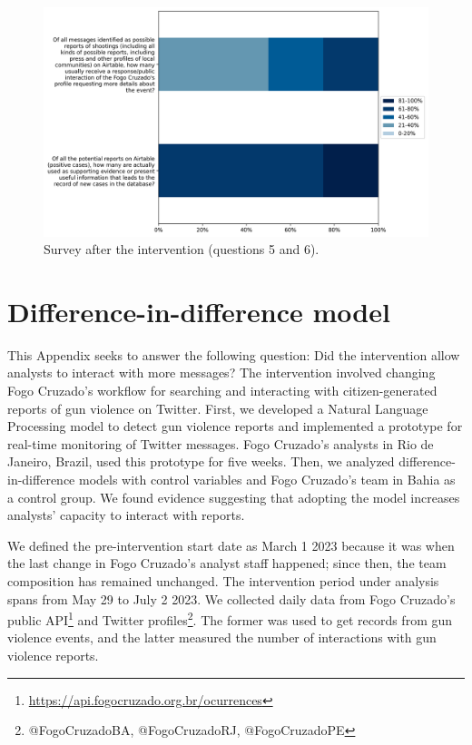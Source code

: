 \documentclass[11pt,letterpaper]{article}
\begin{document}
\begin{figure}[H]
    \centering
    \includegraphics[width=0.8\linewidth]{figs/appendix/post-survey/pos_q5to6.png}
    \caption{Survey after the intervention (questions 5 and 6).}
    \label{fig:postsurvey5to6}
\end{figure}

\section{Difference-in-difference model}

\label{app:diffindiff}
This Appendix seeks to answer the following question: Did the intervention allow analysts to interact with more messages? The intervention involved changing Fogo Cruzado's workflow for searching and interacting with citizen-generated reports of gun violence on Twitter. First, we developed a Natural Language Processing model to detect gun violence reports and implemented a prototype for real-time monitoring of Twitter messages. Fogo Cruzado's analysts in Rio de Janeiro, Brazil, used this prototype for five weeks. Then, we analyzed difference-in-difference models with control variables and Fogo Cruzado's team in Bahia as a control group. We found evidence suggesting that adopting the model increases analysts' capacity to interact with reports.

We defined the pre-intervention start date as March 1 2023 because it was when the last change in Fogo Cruzado's analyst staff happened; since then, the team composition has remained unchanged. The intervention period under analysis spans from May 29 to July 2 2023. We collected daily data from Fogo Cruzado's public API\footnote{\href{https://api.fogocruzado.org.br/ocurrences}{https://api.fogocruzado.org.br/ocurrences}} and Twitter profiles\footnote{@FogoCruzadoBA, @FogoCruzadoRJ, @FogoCruzadoPE}. The former was used to get records from gun violence events, and the latter measured the number of interactions with gun violence reports.
\end{document}
